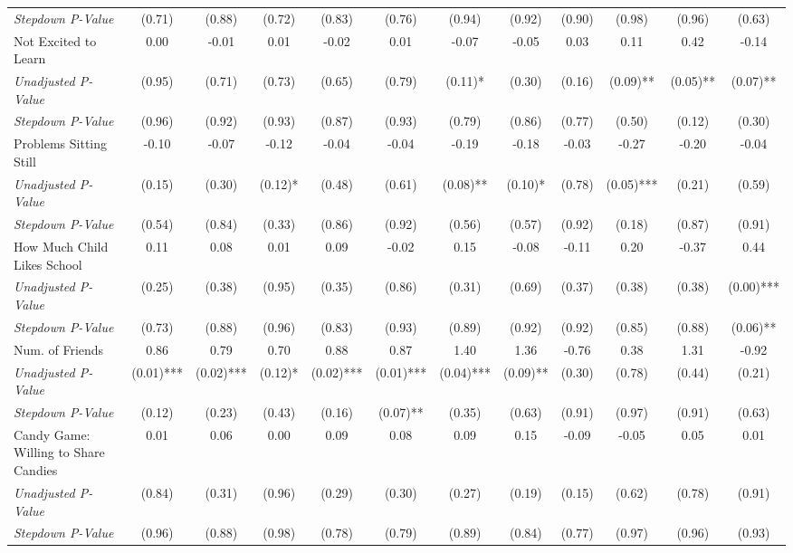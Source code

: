 \begin{tabular}{l c c c c c c c c c c c}
\quad \textit{Stepdown P-Value} & (0.71) & (0.88) & (0.72) & (0.83) & (0.76) & (0.94) & (0.92) & (0.90) & (0.98) & (0.96) & (0.63) \\
Not Excited to Learn & 0.00 & -0.01 & 0.01 & -0.02 & 0.01 & -0.07 & -0.05 & 0.03 & 0.11 & 0.42 & -0.14 \\
\quad \textit{Unadjusted P-Value} & (0.95) & (0.71) & (0.73) & (0.65) & (0.79) & (0.11)* & (0.30) & (0.16) & (0.09)** & (0.05)** & (0.07)** \\
\quad \textit{Stepdown P-Value} & (0.96) & (0.92) & (0.93) & (0.87) & (0.93) & (0.79) & (0.86) & (0.77) & (0.50) & (0.12) & (0.30) \\
Problems Sitting Still & -0.10 & -0.07 & -0.12 & -0.04 & -0.04 & -0.19 & -0.18 & -0.03 & -0.27 & -0.20 & -0.04 \\
\quad \textit{Unadjusted P-Value} & (0.15) & (0.30) & (0.12)* & (0.48) & (0.61) & (0.08)** & (0.10)* & (0.78) & (0.05)*** & (0.21) & (0.59) \\
\quad \textit{Stepdown P-Value} & (0.54) & (0.84) & (0.33) & (0.86) & (0.92) & (0.56) & (0.57) & (0.92) & (0.18) & (0.87) & (0.91) \\
How Much Child Likes School & 0.11 & 0.08 & 0.01 & 0.09 & -0.02 & 0.15 & -0.08 & -0.11 & 0.20 & -0.37 & 0.44 \\
\quad \textit{Unadjusted P-Value} & (0.25) & (0.38) & (0.95) & (0.35) & (0.86) & (0.31) & (0.69) & (0.37) & (0.38) & (0.38) & (0.00)*** \\
\quad \textit{Stepdown P-Value} & (0.73) & (0.88) & (0.96) & (0.83) & (0.93) & (0.89) & (0.92) & (0.92) & (0.85) & (0.88) & (0.06)** \\
Num. of Friends & 0.86 & 0.79 & 0.70 & 0.88 & 0.87 & 1.40 & 1.36 & -0.76 & 0.38 & 1.31 & -0.92 \\
\quad \textit{Unadjusted P-Value} & (0.01)*** & (0.02)*** & (0.12)* & (0.02)*** & (0.01)*** & (0.04)*** & (0.09)** & (0.30) & (0.78) & (0.44) & (0.21) \\
\quad \textit{Stepdown P-Value} & (0.12) & (0.23) & (0.43) & (0.16) & (0.07)** & (0.35) & (0.63) & (0.91) & (0.97) & (0.91) & (0.63) \\
Candy Game: Willing to Share Candies & 0.01 & 0.06 & 0.00 & 0.09 & 0.08 & 0.09 & 0.15 & -0.09 & -0.05 & 0.05 & 0.01 \\
\quad \textit{Unadjusted P-Value} & (0.84) & (0.31) & (0.96) & (0.29) & (0.30) & (0.27) & (0.19) & (0.15) & (0.62) & (0.78) & (0.91) \\
\quad \textit{Stepdown P-Value} & (0.96) & (0.88) & (0.98) & (0.78) & (0.79) & (0.89) & (0.84) & (0.77) & (0.97) & (0.96) & (0.93) \\
\bottomrule
\end{tabular}
